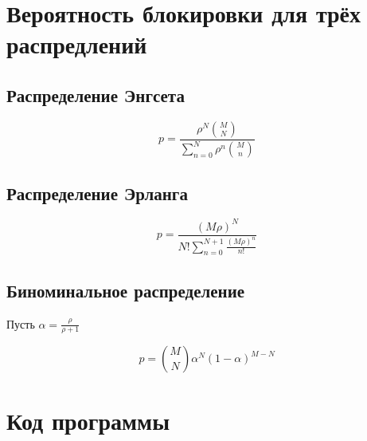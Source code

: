 \documentclass[12pt]{article}
\begin{document}
																																																							

\section{Вероятность блокировки для трёх распредлений}\label{sec:prob}


\subsection{Распределение Энгсета}\label{subsec:engset}

 \[
     p = \frac{\rho ^ N \binom{M}{N}}
     {\sum_{n=0}^{N} \rho ^ n \binom{M}{n}}
 \]

\subsection{Распределение Эрланга}\label{subsec:erlang}

\[
     p = \frac{(M \rho) ^ N}
     {N!\sum_{n=0}^{N + 1} \frac{(M \rho) ^ n}{n!}}
\]

\subsection{Биноминальное распределение}\label{subsec:binom}
Пусть $\alpha = \frac{\rho}{\rho + 1}$

\[
     p = \binom{M}{N} \alpha ^ N (1 - \alpha) ^ {M - N}
\]

\section{Код программы}
\end{document}
